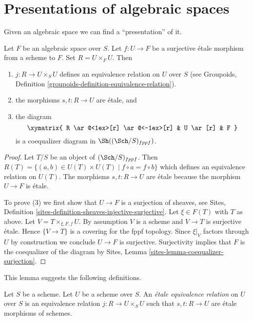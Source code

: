\section{Presentations of algebraic spaces}
\label{section-presentations}

\noindent
Given an algebraic space we can find a ``presentation'' of it.


\begin{lemma}
\label{lemma-space-presentation}
Let $F$ be an algebraic space over $S$. Let $f : U \to F$ be a
surjective \'etale morphism from a scheme to $F$. Set $R = U \times_F U$.
Then
\begin{enumerate}
\item $j : R \to U \times_S U$ defines an equivalence relation on
$U$ over $S$ (see
Groupoids, Definition \ref{groupoids-definition-equivalence-relation}).
\item the morphisms $s, t : R \to U$ are \'etale, and
\item the diagram
$$
\xymatrix{
R \ar@<1ex>[r] \ar@<-1ex>[r] &
U \ar[r] &
F
}
$$
is a coequalizer diagram in $\Sh((\Sch/S)_{fppf})$.
\end{enumerate}
\end{lemma}

\begin{proof}
Let $T/S$ be an object of $(\Sch/S)_{fppf}$.
Then $R(T) = \{(a, b) \in U(T) \times U(T) \mid f \circ a = f \circ b\}$
which defines an equivalence relation on $U(T)$.
The morphisms $s, t : R \to U$ are \'etale because the morphism
$U \to F$ is \'etale.

\medskip\noindent
To prove (3) we first show that
$U \to F$ is a surjection of sheaves, see
Sites, Definition \ref{sites-definition-sheaves-injective-surjective}.
Let $\xi \in F(T)$ with $T$ as above. Let $V = T \times_{\xi, F, f}U$.
By assumption $V$ is a scheme and $V \to T$ is surjective \'etale.
Hence $\{V \to T\}$ is a covering for the fppf topology.
Since $\xi|_V$ factors through $U$ by construction we
conclude $U \to F$ is surjective. Surjectivity implies that
$F$ is the coequalizer of the diagram by
Sites, Lemma \ref{sites-lemma-coequalizer-surjection}.
\end{proof}

\noindent
This lemma suggests the following definitions.

\begin{definition}
\label{definition-etale-equivalence-relation}
Let $S$ be a scheme. Let $U$ be a scheme over $S$.
An {\it \'etale equivalence relation} on $U$ over $S$
is an equivalence relation $j : R \to U \times_S U$
such that $s, t : R \to U$ are \'etale morphisms of schemes.
\end{definition}

